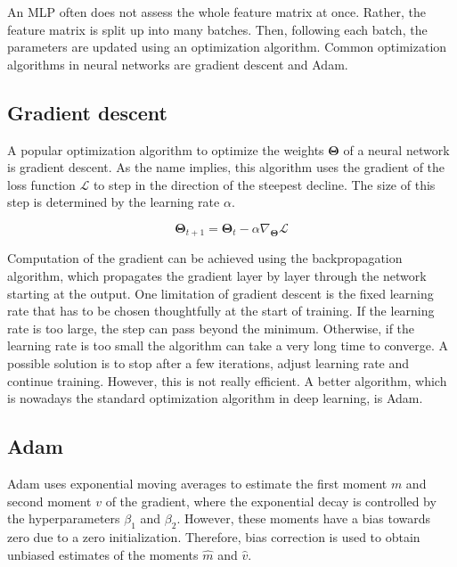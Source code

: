 An MLP often does not assess the whole feature matrix at once. Rather, the feature
matrix is split up into many batches. Then, following each batch, the parameters are
updated using an optimization algorithm. Common optimization algorithms in neural networks
are gradient descent and Adam.


\subsection{Gradient descent}


A popular optimization algorithm to optimize the weights $\pmb{\Theta}$ of a neural network is
gradient descent.\cite{ruder2016overview} As the name implies, this algorithm
uses the gradient of the loss function $\mathcal{L}$ to step in the direction of the
steepest decline. The size of this step is determined by the learning rate $\alpha$.

\begin{equation}
	\pmb{\Theta}_{t+1} = \pmb{\Theta}_{t} - \alpha \nabla_{\pmb{\Theta}} \mathcal{L}
\end{equation}

Computation of the gradient can be achieved using the backpropagation algorithm, which
propagates the gradient layer by layer through the network starting at the output.
\cite{lecun1988theoretical} One limitation of gradient descent is the
fixed learning rate that has to be chosen thoughtfully at the start of training.
If the learning rate is too large, the step can pass beyond the minimum. Otherwise,
if the learning rate is too small the algorithm can take a very long time to converge.
A possible solution is to stop after a few iterations, adjust learning rate and
continue training. However, this is not really efficient. A better algorithm,
which is nowadays the standard optimization algorithm in deep learning, is Adam.\cite{kingma2014adam}


\subsection{Adam}

Adam uses exponential moving averages to estimate the first moment $m$ and 
second moment $v$ of the gradient, where the exponential decay is controlled 
by the hyperparameters $\beta_1$ and $\beta_2$. However, these moments have 
a bias towards zero due to a zero initialization. Therefore, bias correction 
is used to obtain unbiased estimates of the moments $\hat{m}$ and $\hat{v}$.\cite{kingma2014adam}


